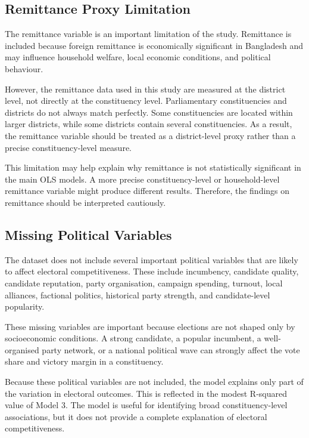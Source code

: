 \documentclass[12pt,a4paper]{article}
\begin{document}
\subsection{Remittance Proxy Limitation}

The remittance variable is an important limitation of the study. Remittance is included because foreign remittance is economically significant in Bangladesh and may influence household welfare, local economic conditions, and political behaviour.

However, the remittance data used in this study are measured at the district level, not directly at the constituency level. Parliamentary constituencies and districts do not always match perfectly. Some constituencies are located within larger districts, while some districts contain several constituencies. As a result, the remittance variable should be treated as a district-level proxy rather than a precise constituency-level measure.

This limitation may help explain why remittance is not statistically significant in the main OLS models. A more precise constituency-level or household-level remittance variable might produce different results. Therefore, the findings on remittance should be interpreted cautiously.

\subsection{Missing Political Variables}

The dataset does not include several important political variables that are likely to affect electoral competitiveness. These include incumbency, candidate quality, candidate reputation, party organisation, campaign spending, turnout, local alliances, factional politics, historical party strength, and candidate-level popularity.

These missing variables are important because elections are not shaped only by socioeconomic conditions. A strong candidate, a popular incumbent, a well-organised party network, or a national political wave can strongly affect the vote share and victory margin in a constituency.

Because these political variables are not included, the model explains only part of the variation in electoral outcomes. This is reflected in the modest R-squared value of Model 3. The model is useful for identifying broad constituency-level associations, but it does not provide a complete explanation of electoral competitiveness.
\end{document}

